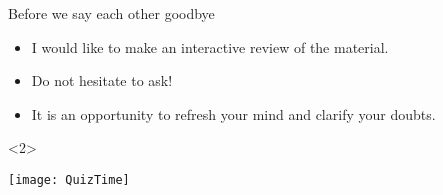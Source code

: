 
\begin{frame}{Before we say each other goodbye}
    \begin{itemize}
        \item I would like to make an interactive review of the material.
        \item Do not hesitate to ask!
        \item It is an opportunity to refresh your mind and clarify your doubts.
    \end{itemize}
    \vspace{5mm}
    \begin{uncoverenv}<2>
        \centerline{\texttt{[image: QuizTime]}}
    \end{uncoverenv}
\end{frame}
